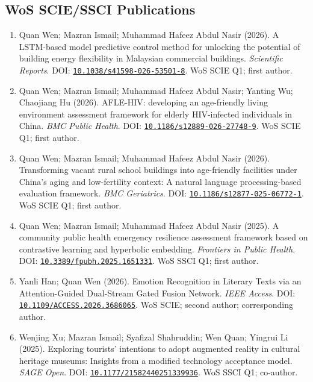 \documentclass[11pt,a4paper]{article}
\newcommand{\doi}[1]{\href{https://doi.org/#1}{\nolinkurl{#1}}}
\newcommand{\pub}[6]{\item #1 (#2). #3. \textit{#4}. DOI: \doi{#5}. #6}
\begin{document}
\subsection*{WoS SCIE/SSCI Publications}
\begin{enumerate}
  \pub{Quan Wen; Mazran Ismail; Muhammad Hafeez Abdul Nasir}{2026}{A LSTM-based model predictive control method for unlocking the potential of building energy flexibility in Malaysian commercial buildings}{Scientific Reports}{10.1038/s41598-026-53501-8}{WoS SCIE Q1; first author.}
  \pub{Quan Wen; Mazran Ismail; Muhammad Hafeez Abdul Nasir; Yanting Wu; Chaojiang Hu}{2026}{AFLE-HIV: developing an age-friendly living environment assessment framework for elderly HIV-infected individuals in China}{BMC Public Health}{10.1186/s12889-026-27748-9}{WoS SCIE Q1; first author.}
  \pub{Quan Wen; Mazran Ismail; Muhammad Hafeez Abdul Nasir}{2026}{Transforming vacant rural school buildings into age-friendly facilities under China's aging and low-fertility context: A natural language processing-based evaluation framework}{BMC Geriatrics}{10.1186/s12877-025-06772-1}{WoS SCIE Q1; first author.}
  \pub{Quan Wen; Mazran Ismail; Muhammad Hafeez Abdul Nasir}{2025}{A community public health emergency resilience assessment framework based on contrastive learning and hyperbolic embedding}{Frontiers in Public Health}{10.3389/fpubh.2025.1651331}{WoS SSCI Q1; first author.}
  \pub{Yanli Han; Quan Wen}{2026}{Emotion Recognition in Literary Texts via an Attention-Guided Dual-Stream Gated Fusion Network}{IEEE Access}{10.1109/ACCESS.2026.3686065}{WoS SCIE; second author; corresponding author.}
  \pub{Wenjing Xu; Mazran Ismail; Syafizal Shahruddin; Wen Quan; Yingrui Li}{2025}{Exploring tourists' intentions to adopt augmented reality in cultural heritage museums: Insights from a modified technology acceptance model}{SAGE Open}{10.1177/21582440251339936}{WoS SSCI Q1; co-author.}
\end{enumerate}
\end{document}
